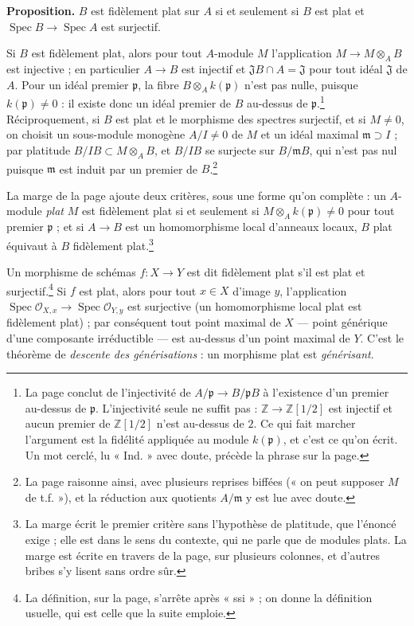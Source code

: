 \documentclass[11pt,a4paper]{article}
\begin{document}
\textbf{Proposition.} $B$ est fidèlement plat sur $A$ si et seulement si $B$
est plat et $\operatorname{Spec} B \to \operatorname{Spec} A$ est surjectif.

Si $B$ est fidèlement plat, alors pour tout $A$-module $M$ l'application
$M \to M \otimes_A B$ est injective ; en particulier $A \to B$ est injectif et
$\mathfrak{J} B \cap A = \mathfrak{J}$ pour tout idéal $\mathfrak{J}$ de $A$.
Pour un idéal premier $\mathfrak{p}$, la fibre $B \otimes_A k(\mathfrak{p})$
n'est pas nulle, puisque $k(\mathfrak{p}) \neq 0$ : il existe donc un idéal
premier de $B$ au-dessus de $\mathfrak{p}$.\footnote{La page conclut de
l'injectivité de $A/\mathfrak{p} \to B/\mathfrak{p}B$ à l'existence d'un
premier au-dessus de $\mathfrak{p}$. L'injectivité seule ne suffit pas :
$\mathbb{Z} \to \mathbb{Z}[1/2]$ est injectif et aucun premier de
$\mathbb{Z}[1/2]$ n'est au-dessus de $2$. Ce qui fait marcher l'argument est la
fidélité appliquée au module $k(\mathfrak{p})$, et c'est ce qu'on écrit. Un mot
cerclé, lu « Ind. » avec doute, précède la phrase sur la page.} Réciproquement,
si $B$ est plat et le morphisme des spectres surjectif, et si $M \neq 0$, on
choisit un sous-module monogène $A/I \neq 0$ de $M$ et un idéal maximal
$\mathfrak{m} \supset I$ ; par platitude $B/IB \subset M \otimes_A B$, et
$B/IB$ se surjecte sur $B/\mathfrak{m}B$, qui n'est pas nul puisque
$\mathfrak{m}$ est induit par un premier de $B$.\footnote{La page raisonne
ainsi, avec plusieurs reprises biffées (« on peut supposer $M$ de t.f. »), et la
réduction aux quotients $A/\mathfrak{m}$ y est lue avec doute.}

La marge de la page ajoute deux critères, sous une forme qu'on complète :
un $A$-module \emph{plat} $M$ est fidèlement plat si et seulement si
$M \otimes_A k(\mathfrak{p}) \neq 0$ pour tout premier $\mathfrak{p}$ ; et si
$A \to B$ est un homomorphisme local d'anneaux locaux, $B$ plat équivaut à
$B$ fidèlement plat.\footnote{La marge écrit le premier critère sans
l'hypothèse de platitude, que l'énoncé exige ; elle est dans le sens du
contexte, qui ne parle que de modules plats. La marge est écrite en travers de
la page, sur plusieurs colonnes, et d'autres bribes s'y lisent sans ordre sûr.}

Un morphisme de schémas $f : X \to Y$ est dit fidèlement plat s'il est plat et
surjectif.\footnote{La définition, sur la page, s'arrête après « ssi » ; on
donne la définition usuelle, qui est celle que la suite emploie.} Si $f$ est
plat, alors pour tout $x \in X$ d'image $y$, l'application
$\operatorname{Spec} \mathcal{O}_{X,x} \to \operatorname{Spec} \mathcal{O}_{Y,y}$
est surjective (un homomorphisme local plat est fidèlement plat) ; par
conséquent tout point maximal de $X$ --- point générique d'une composante
irréductible --- est au-dessus d'un point maximal de $Y$. C'est le théorème de
\emph{descente des générisations} : un morphisme plat est
\emph{générisant}.
\end{document}

